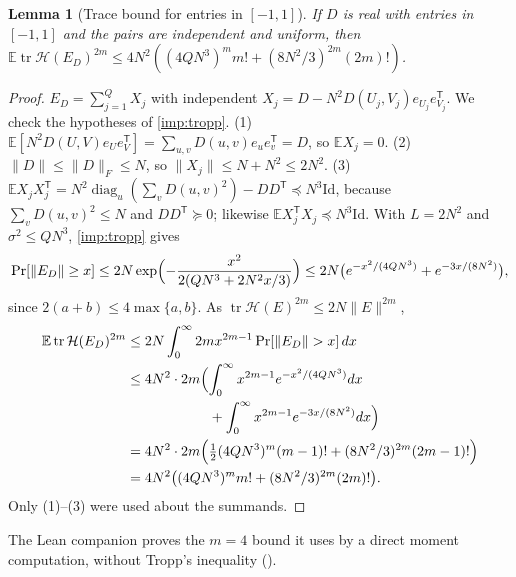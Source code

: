 \documentclass[11pt,letterpaper]{article}
\newtheorem{lemma}[theorem]{Lemma}
\theoremstyle{definition}
\theoremstyle{remark}
\newcommand{\E}{\mathbb E}
\newcommand{\tr}{\operatorname{tr}}
\newcommand{\diag}{\operatorname{diag}}
\newcommand{\cH}{\mathcal H}
\newcommand{\Id}{\mathrm{Id}}
\begin{document}
\begin{lemma}[Trace bound for entries in {$[-1,1]$}]\label{lem:tracebound}
If \(D\) is real with entries in \([-1,1]\) and the pairs are
independent and uniform, then
\(\E\tr\cH(E_D)^{2m}\le4N^2((4QN^3)^mm!+(8N^2/3)^{2m}(2m)!)\).
\end{lemma}
\begin{proof}
\(E_D=\sum_{j=1}^QX_j\) with independent
\(X_j=D-N^2D(U_j,V_j)e_{U_j}e_{V_j}^{\mathsf T}\). We check the
hypotheses of \cref{imp:tropp}.
(1) \(\E[N^2D(U,V)e_Ue_V^{\mathsf T}]=\sum_{u,v}D(u,v)e_ue_v^{\mathsf T}=D\),
so \(\E X_j=0\).
(2) \(\|D\|\le\|D\|_F\le N\), so \(\|X_j\|\le N+N^2\le2N^2\).
(3) \(\E X_jX_j^{\mathsf T}=N^2\diag_u(\sum_vD(u,v)^2)-DD^{\mathsf T}\preceq N^3\Id\),
because \(\sum_vD(u,v)^2\le N\) and \(DD^{\mathsf T}\succeq0\); likewise
\(\E X_j^{\mathsf T}X_j\preceq N^3\Id\).
With \(L=2N^2\) and \(\sigma^2\le QN^3\), \cref{imp:tropp} gives
\[
 \Pr[\|E_D\|\ge x]\le2N\exp\Bigl(-\frac{x^2}{2(QN^3+2N^2x/3)}\Bigr)
 \le2N\bigl(e^{-x^2/(4QN^3)}+e^{-3x/(8N^2)}\bigr),
\]
since \(2(a+b)\le4\max\{a,b\}\). As
\(\tr\cH(E)^{2m}\le2N\|E\|^{2m}\),
\begin{align*}
 \E\tr\cH(E_D)^{2m}&\le2N\int_0^\infty2mx^{2m-1}\Pr[\|E_D\|>x]\,dx\\
 &\le4N^2\cdot2m\Bigl(\int_0^\infty x^{2m-1}e^{-x^2/(4QN^3)}dx\\
 &\hphantom{{}\le4N^2\cdot2m\Bigl(}+\int_0^\infty x^{2m-1}e^{-3x/(8N^2)}dx\Bigr)\\
 &=4N^2\cdot2m\Bigl(\tfrac12(4QN^3)^m(m-1)!+(8N^2/3)^{2m}(2m-1)!\Bigr)\\
 &=4N^2\bigl((4QN^3)^mm!+(8N^2/3)^{2m}(2m)!\bigr).
\end{align*}
Only (1)--(3) were used about the summands.
\end{proof}
The Lean companion proves the \(m=4\) bound it uses by a direct moment computation, without Tropp's inequality ().
\end{document}
